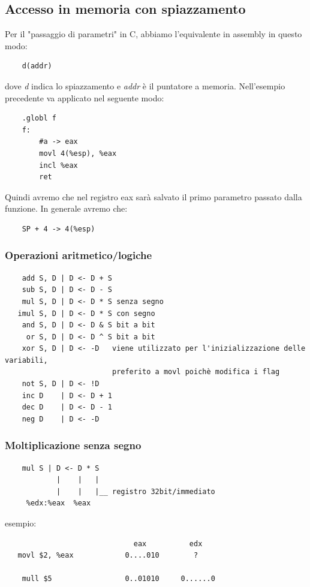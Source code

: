 \subsection{Accesso in memoria con spiazzamento}
Per il "passaggio di parametri" in C, abbiamo l'equivalente in assembly in questo modo:
\begin{verbatim}
    d(addr) 
\end{verbatim}
dove \textit{d} indica lo spiazzamento e \textit{addr} è il puntatore a memoria. Nell'esempio precedente va applicato nel seguente modo:
\begin{verbatim}
    .globl f
    f:
        #a -> eax
        movl 4(%esp), %eax
        incl %eax
        ret
\end{verbatim}
Quindi avremo che nel registro eax sarà salvato il primo parametro passato dalla funzione. In generale avremo che:
\begin{verbatim}
    SP + 4 -> 4(%esp)
\end{verbatim}

\subsubsection{Operazioni aritmetico/logiche}
\begin{verbatim}
    add S, D | D <- D + S
    sub S, D | D <- D - S
    mul S, D | D <- D * S senza segno
   imul S, D | D <- D * S con segno
    and S, D | D <- D & S bit a bit
     or S, D | D <- D ^ S bit a bit
    xor S, D | D <- -D   viene utilizzato per l'inizializzazione delle variabili, 
                         preferito a movl poichè modifica i flag
    not S, D | D <- !D
    inc D    | D <- D + 1  
    dec D    | D <- D - 1
    neg D    | D <- -D
\end{verbatim}

\subsubsection{Moltiplicazione senza segno}
\begin{verbatim}
    mul S | D <- D * S 
            |    |   |
            |    |   |__ registro 32bit/immediato
     %edx:%eax  %eax   
\end{verbatim}
\noindent esempio:
\begin{verbatim}
                              eax          edx 
   movl $2, %eax            0....010        ?
                            
    mull $5                 0..01010     0......0
\end{verbatim}

